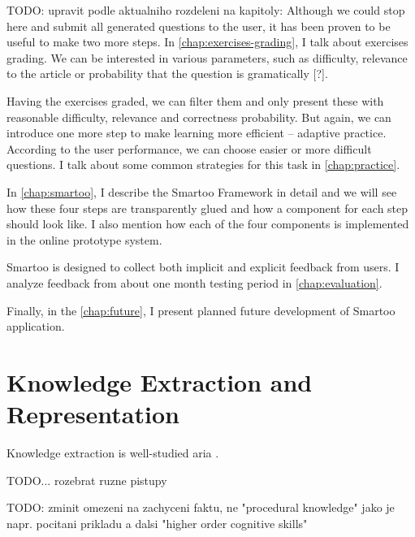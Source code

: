 \documentclass[a4paper, 12pt, twoside]{fithesis2}		%
\renewcommand{\_}{\leavevmode \kern0.0em\vbox{\hrule width0.4em}}
\begin{document}
TODO: upravit podle aktualniho rozdeleni na kapitoly: Although we could stop here and submit all generated questions to the user, it has been proven to be useful to make two more steps.
In \autoref{chap:exercises-grading}, I talk about exercises grading.
We can be interested in various parameters, such as difficulty, relevance to the article or probability that the question is gramatically [?].

Having the exercises graded, we can filter them and only present these with reasonable difficulty, relevance and correctness probability.
But again, we can introduce one more step to make learning more efficient -- adaptive practice.
According to the user performance, we can choose easier or more difficult questions. I talk about some common strategies for this task in \autoref{chap:practice}.

In \autoref{chap:smartoo}, I describe the Smartoo Framework in detail
and we will see how these four steps are transparently glued and how a component for each step should look like.
I also mention how each of the four components is implemented in the online prototype system.

Smartoo is designed to collect both implicit and explicit feedback from users.
I analyze feedback from about one month testing period in \autoref{chap:evaluation}.

Finally, in the \autoref{chap:future}, I present planned future development of Smartoo application.





\chapter{Knowledge Extraction and Representation}
\label{chap:knowledge}

Knowledge extraction is well-studied aria \parencite{triples-acquisition}.

TODO... rozebrat ruzne pistupy


TODO: zminit omezeni na zachyceni faktu, ne "procedural knowledge" jako je napr. pocitani prikladu a dalsi "higher order cognitive skills"
\end{document}
